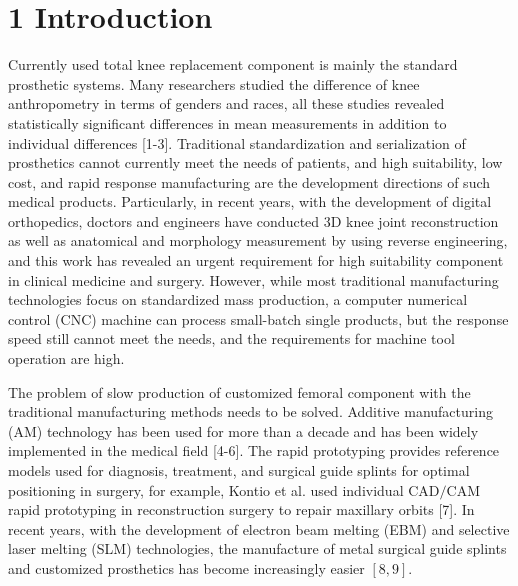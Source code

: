 \documentclass[10pt]{article}
\begin{document}
\section*{1 Introduction}
Currently used total knee replacement component is mainly the standard prosthetic systems. Many researchers studied the difference of knee anthropometry in terms of genders and races, all these studies revealed statistically significant differences in mean measurements in addition to individual differences [1-3]. Traditional standardization and serialization of prosthetics cannot currently meet the needs of patients, and high suitability, low cost, and rapid response manufacturing are the development directions of such medical products. Particularly, in recent years, with the development of digital orthopedics, doctors and engineers have conducted 3D knee joint reconstruction as well as anatomical and morphology measurement by using reverse engineering, and this work has revealed an urgent requirement for high suitability component in clinical medicine and surgery. However, while most traditional manufacturing technologies focus on standardized mass production, a computer numerical control (CNC) machine can process small-batch single products, but the response speed still cannot meet the needs, and the requirements for machine tool operation are high.

The problem of slow production of customized femoral component with the traditional manufacturing methods needs to be solved. Additive manufacturing (AM) technology has been used for more than a decade and has been widely implemented in the medical field [4-6]. The rapid prototyping provides reference models used for diagnosis, treatment, and surgical guide splints for optimal positioning in surgery, for example, Kontio et al. used individual $\mathrm{CAD} / \mathrm{CAM}$ rapid prototyping in reconstruction surgery to repair maxillary orbits [7]. In recent years, with the development of electron beam melting (EBM) and selective laser melting (SLM) technologies, the manufacture of metal surgical guide splints and customized prosthetics has become increasingly easier $[8,9]$.
\end{document}
